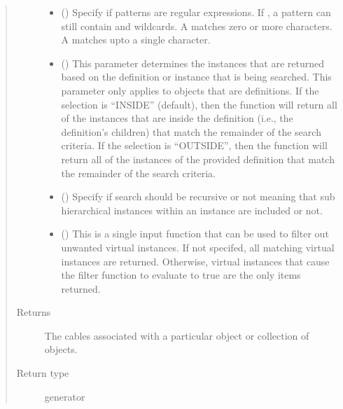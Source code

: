 \documentclass[letterpaper,10pt,english,openany,oneside]{sphinxmanual}
\begin{document}
\begin{fulllineitems}
\begin{quote}
\begin{description}
\begin{itemize}
\item {} 
 () \textendash{} Specify if patterns are regular expressions. If , a pattern can still contain \sphinxtitleref{*} and  wildcards. A
\sphinxtitleref{*} matches zero or more characters. A  matches upto a single character.

\item {} 
 () \textendash{} This parameter determines the instances that are returned based on the definition or instance that is being
searched. This parameter only applies to objects that are definitions. If the selection is “INSIDE” (default),
then the function will return all of the instances that are inside the definition (i.e., the definition’s
children) that match the remainder of the search criteria. If the selection is “OUTSIDE”, then the function will
return all of the instances of the provided definition that match the remainder of the search criteria.

\item {} 
 () \textendash{} Specify if search should be recursive or not meaning that sub hierarchical instances within an instance are
included or not.

\item {} 
 () \textendash{} This is a single input function that can be used to filter out unwanted virtual instances. If not specifed, all
matching virtual instances are returned. Otherwise, virtual instances that cause the filter function to evaluate
to true are the only items returned.

\end{itemize}

\item[{Returns}] \leavevmode
{} \textendash{} The cables associated with a particular object or collection of objects.

\item[{Return type}] \leavevmode
generator

\end{description}\end{quote}

\end{fulllineitems}
\end{document}
